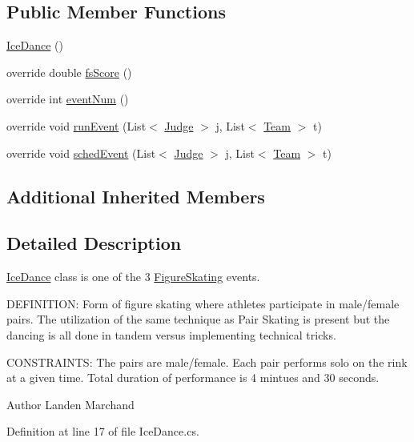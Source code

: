 \subsection*{Public Member Functions}
\begin{DoxyCompactItemize}
\item 
\hyperlink{classPCO_1_1IceDance_af8e9012b4a272fc2338c009dc25a5080}{Ice\+Dance} ()
\item 
override double \hyperlink{classPCO_1_1IceDance_a277430a17d25085022ea3567a133fa81}{fs\+Score} ()
\item 
override int \hyperlink{classPCO_1_1IceDance_a4b5fe113cbbb0d2b59f97b58c3b15e79}{event\+Num} ()
\item 
override void \hyperlink{classPCO_1_1IceDance_ace6551516fc450a992074dacaff19294}{run\+Event} (List$<$ \hyperlink{classPCO_1_1Judge}{Judge} $>$ j, List$<$ \hyperlink{classPCO_1_1Team}{Team} $>$ t)
\item 
override void \hyperlink{classPCO_1_1IceDance_a60f5dea6597535a8b06baed8d71a27e1}{sched\+Event} (List$<$ \hyperlink{classPCO_1_1Judge}{Judge} $>$ j, List$<$ \hyperlink{classPCO_1_1Team}{Team} $>$ t)
\end{DoxyCompactItemize}
\subsection*{Additional Inherited Members}


\subsection{Detailed Description}
\hyperlink{classPCO_1_1IceDance}{Ice\+Dance} class is one of the 3 \hyperlink{classPCO_1_1FigureSkating}{Figure\+Skating} events. 

D\+E\+F\+I\+N\+I\+T\+I\+O\+N\+: Form of figure skating where athletes participate in male/female pairs. The utilization of the same technique as Pair Skating is present but the dancing is all done in tandem versus implementing technical tricks.

C\+O\+N\+S\+T\+R\+A\+I\+N\+T\+S\+: The pairs are male/female. Each pair performs solo on the rink at a given time. Total duration of performance is 4 mintues and 30 seconds.\begin{DoxyAuthor}{Author}
Landen Marchand 
\end{DoxyAuthor}


Definition at line 17 of file Ice\+Dance.\+cs.



